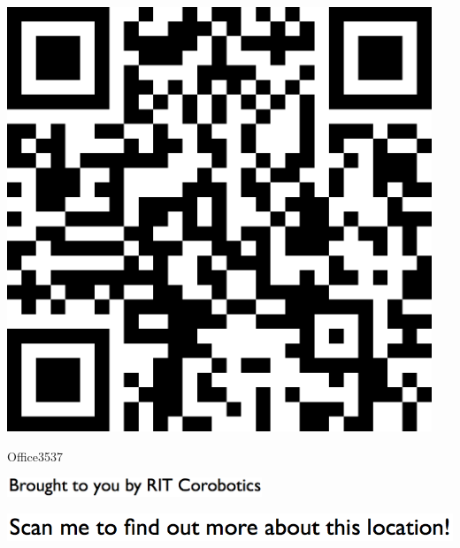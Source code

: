\documentclass[letterpaper]{article}
\begin{document}
 \begingroup 
 \centerline{\includegraphics[scale=1,width=5in,height=5in]{Office3537.png}} 
 \endgroup 
 \vspace*{\fill} 

 \hfill{\small Office3537} 

  \vspace{0.7in} 
 
 \centerline{\includegraphics[scale=1,width=3in]{text-bottom.png}} 
 
 \pagebreak 
{} 
 \vspace*{\fill} 
 
  \centerline{\includegraphics[scale=1,width=6in]{text-top.png}} 
 
 \vspace{0.5in} 
 
\end{document}
